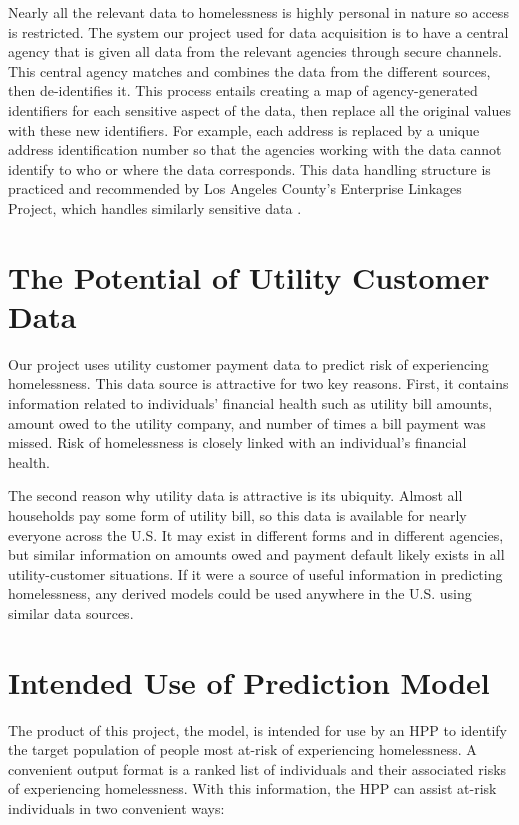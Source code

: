\documentclass[12pt]{report}
\begin{document}
Nearly all the relevant data to homelessness is highly personal in nature so access is restricted. The system our project used for data acquisition is to have a central agency that is given all data from the relevant agencies through secure channels. This central agency matches and combines the data from the different sources, then de-identifies it. This process entails creating a map of agency-generated identifiers for each sensitive aspect of the data, then replace all the original values with these new identifiers. For example, each address is replaced by a unique address identification number so that the agencies working with the data cannot identify to who or where the data corresponds. This data handling structure is practiced and recommended by Los Angeles County’s Enterprise Linkages Project, which handles similarly sensitive data \cite{byrne2012angeles}.

\section{The Potential of Utility Customer Data}
Our project uses utility customer payment data to predict risk of experiencing homelessness. This data source is attractive for two key reasons. First, it contains information related to individuals' financial health such as utility bill amounts, amount owed to the utility company, and number of times a bill payment was missed. Risk of homelessness is closely linked with an individual's financial health.

The second reason why utility data is attractive is its ubiquity. Almost all households pay some form of utility bill, so this data is available for nearly everyone across the U.S. It may exist in different forms and in different agencies, but similar information on amounts owed and payment default likely exists in all utility-customer situations. If it were a source of useful information in predicting homelessness, any derived models could be used anywhere in the U.S. using similar data sources. 

\section{Intended Use of Prediction Model}
The product of this project, the model, is intended for use by an HPP to identify the target population of people most at-risk of experiencing homelessness. A convenient output format is a ranked list of individuals and their associated risks of experiencing homelessness. With this information, the HPP can assist at-risk individuals in two convenient ways:
\end{document}
